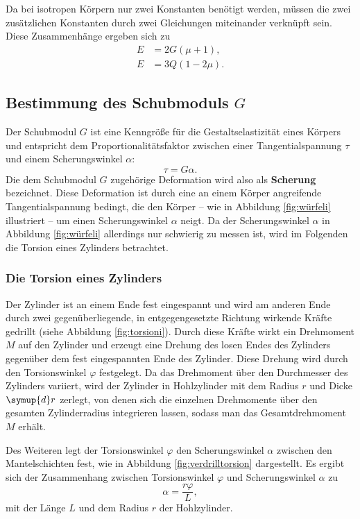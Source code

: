 Da bei isotropen Körpern nur zwei Konstanten benötigt werden, müssen die zwei zusätzlichen
Konstanten durch zwei Gleichungen miteinander verknüpft sein.
Diese Zusammenhänge ergeben sich zu 
\begin{align}
	E &= 2G (\mu + 1) \mathrm{,} \\
	E &= 3Q (1 - 2\mu) \mathrm{.}
\end{align}
\FloatBarrier

\subsection{Bestimmung des Schubmoduls $G$}

Der Schubmodul $G$ ist eine Kenngröße für die Gestaltselastizität eines Körpers und entspricht 
dem Proportionalitätsfaktor zwischen einer Tangentialspannung $\tau$ und einem Scherungswinkel 
$\alpha$:
\begin{equation}
	\label{eqn:schubimoduli}
	\tau = G \alpha \mathrm{.}
\end{equation}
Die dem Schubmodul $G$ zugehörige Deformation wird also als \textbf{Scherung} bezeichnet.
Diese Deformation ist durch eine an einem Körper angreifende Tangentialspannung bedingt, die 
den Körper -- wie in Abbildung \ref{fig:würfeli} illustriert -- um einen Scherungswinkel $\alpha$
neigt.
Da der Scherungswinkel $\alpha$ in Abbildung \ref{fig:würfeli} allerdings nur schwierig zu messen
ist, wird im Folgenden die Torsion eines Zylinders betrachtet.

\subsubsection{Die Torsion eines Zylinders}
\label{sec:torsionii}
Der Zylinder ist an einem Ende fest eingespannt und wird am anderen Ende durch zwei
gegenüberliegende, in entgegengesetzte Richtung wirkende Kräfte gedrillt (siehe Abbildung 
\ref{fig:torsioni}).
Durch diese Kräfte wirkt ein Drehmoment $M$ auf den Zylinder und erzeugt eine Drehung des losen
Endes des Zylinders gegenüber dem fest eingespannten Ende des Zylinder. Diese Drehung wird 
durch den Torsionswinkel $\varphi$ festgelegt.
Da das Drehmoment über den Durchmesser des Zylinders variiert, wird der Zylinder in Hohlzylinder 
mit dem Radius $r$ und Dicke $\symup{d} r$ zerlegt, von denen sich die einzelnen Drehmomente 
über den gesamten Zylinderradius integrieren lassen, sodass man das Gesamtdrehmoment $M$ 
erhält.

Des Weiteren legt der Torsionswinkel $\varphi$ den Scherungswinkel $\alpha$ zwischen den 
Mantelschichten fest, wie in Abbildung \ref{fig:verdrilltorsion} dargestellt.
Es ergibt sich der Zusammenhang zwischen Torsionswinkel $\varphi$ und Scherungswinkel $\alpha$ 
zu 
\begin{equation}
	\label{eqn:variphi}
	\alpha = \frac{r \varphi}{L} \mathrm{,}
\end{equation}
mit der Länge $L$ und dem Radius $r$ der Hohlzylinder.

